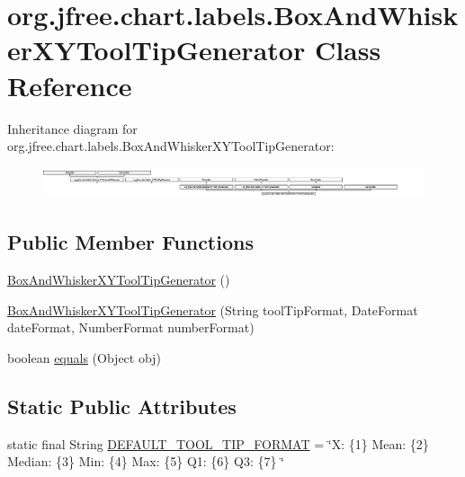 \hypertarget{classorg_1_1jfree_1_1chart_1_1labels_1_1_box_and_whisker_x_y_tool_tip_generator}{}\section{org.\+jfree.\+chart.\+labels.\+Box\+And\+Whisker\+X\+Y\+Tool\+Tip\+Generator Class Reference}
\label{classorg_1_1jfree_1_1chart_1_1labels_1_1_box_and_whisker_x_y_tool_tip_generator}
Inheritance diagram for org.\+jfree.\+chart.\+labels.\+Box\+And\+Whisker\+X\+Y\+Tool\+Tip\+Generator\+:\begin{figure}[H]
\begin{center}
\leavevmode
\includegraphics[height=0.919540cm]{classorg_1_1jfree_1_1chart_1_1labels_1_1_box_and_whisker_x_y_tool_tip_generator}
\end{center}
\end{figure}
\subsection*{Public Member Functions}
\begin{DoxyCompactItemize}
\item 
\mbox{\hyperlink{classorg_1_1jfree_1_1chart_1_1labels_1_1_box_and_whisker_x_y_tool_tip_generator_a71cc48d241117acfa4c90036a6ff571c}{Box\+And\+Whisker\+X\+Y\+Tool\+Tip\+Generator}} ()
\item 
\mbox{\hyperlink{classorg_1_1jfree_1_1chart_1_1labels_1_1_box_and_whisker_x_y_tool_tip_generator_ac43da4c4d4184c5d7de4e12a2ba6eb2f}{Box\+And\+Whisker\+X\+Y\+Tool\+Tip\+Generator}} (String tool\+Tip\+Format, Date\+Format date\+Format, Number\+Format number\+Format)
\item 
boolean \mbox{\hyperlink{classorg_1_1jfree_1_1chart_1_1labels_1_1_box_and_whisker_x_y_tool_tip_generator_a3f170941337e3ae1829bc415c1c68a4a}{equals}} (Object obj)
\end{DoxyCompactItemize}
\subsection*{Static Public Attributes}
\begin{DoxyCompactItemize}
\item 
static final String \mbox{\hyperlink{classorg_1_1jfree_1_1chart_1_1labels_1_1_box_and_whisker_x_y_tool_tip_generator_af0f0002055b6f2e207bfa6510786a0a8}{D\+E\+F\+A\+U\+L\+T\+\_\+\+T\+O\+O\+L\+\_\+\+T\+I\+P\+\_\+\+F\+O\+R\+M\+AT}} = \char`\"{}X\+: \{1\} Mean\+: \{2\} Median\+: \{3\} Min\+: \{4\} Max\+: \{5\} Q1\+: \{6\} Q3\+: \{7\} \char`\"{}
\end{DoxyCompactItemize}
